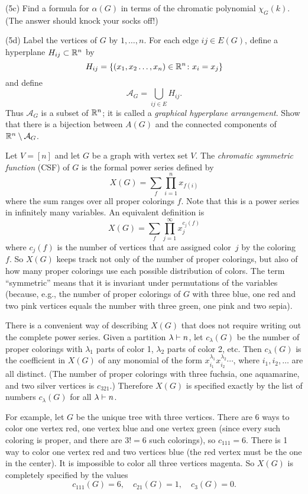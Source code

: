 (5c) Find a formula for $\alpha(G)$ in terms of the chromatic polynomial $\chi_G(k)$.
(The answer should knock your socks off!)

(5d) Label the vertices of $G$ by $1,\dots,n$.  For each edge $ij\in E(G)$, define a hyperplane $H_{ij}\subset\mathbb{R}^n$ by
\[H_{ij} = \{(x_1,x_2\dots,x_n)\in\mathbb{R}^n \colon x_i=x_j\}\]
and define
\[\mathcal{A}_G = \bigcup_{ij\in E} H_{ij}.\]
Thus $\mathcal{A}_G$ is a subset of $\mathbb{R}^n$; it is called a \emph{graphical hyperplane arrangement}.  Show that there is a bijection between $A(G)$ and the connected components of $\mathbb{R}^n\setminus\mathcal{A}_G$.

\prob
Let $V=[n]$ and let $G$ be a graph with vertex set $V$.
The \emph{chromatic symmetric function} (CSF) of $G$ is the formal power series
defined by
\[X(G) = \sum_f \prod_{i=1}^n x_{f(i)}\]
where the sum ranges over all proper colorings $f$.  Note that this is a power series in infinitely many variables.  An equivalent definition is
\[X(G) = \sum_f \prod_{j=1}^\infty x_j^{c_j(f)}\]
where $c_j(f)$ is the number of vertices that are assigned color~$j$ by the coloring~$f$.  So $X(G)$ keeps track not only of the number of proper colorings, but also of how many proper colorings use each possible distribution of colors.  The term ``symmetric'' means that it is invariant under permutations of the variables (because, e.g., the number of proper colorings of $G$ with three blue, one red and two pink vertices equals the number with three green, one pink and two sepia).

There is a convenient way of describing $X(G)$ that does not require writing out the complete power series.  Given a partition $\lambda\vdash n$, let $c_\lambda(G)$ be the number of proper colorings with $\lambda_1$ parts of color 1, $\lambda_2$ parts of color 2, etc.  Then $c_\lambda(G)$ is the coefficient in $X(G)$ of any monomial of the form $x_{i_1}^{\lambda_1}x_{i_2}^{\lambda_2}\cdots$, where $i_1,i_2,\dots$ are all distinct.  (The number of proper colorings with three fuchsia, one aquamarine, and two silver vertices is $c_{321}$.)  Therefore $X(G)$ is specified exactly by the list of numbers $c_\lambda(G)$ for all $\lambda\vdash n$.

For example, let $G$ be the unique tree with three vertices.  There are
6 ways to color one vertex red, one vertex blue and one vertex green (since every such coloring is proper, and there are $3!=6$ such colorings), so $c_{111}=6$.
There is 1 way to color one vertex red and two vertices blue (the red vertex must be the one in the center).  It is impossible to color all three vertices magenta.  So $X(G)$ is completely specified by the values
\[c_{111}(G)=6, \quad c_{21}(G)=1,\quad c_{3}(G)=0.\]

